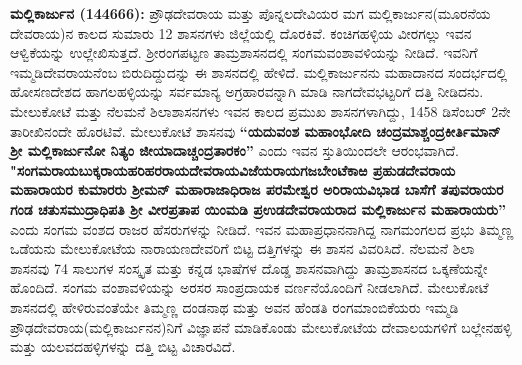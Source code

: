 \textbf{ಮಲ್ಲಿಕಾರ್ಜುನ (1446\general{\enginline{-}}66): }ಪ್ರೌಢದೇವರಾಯ ಮತ್ತು ಪೊನ್ನಲದೇವಿಯರ ಮಗ ಮಲ್ಲಿಕಾರ್ಜುನ\break (ಮೂರನೆಯ ದೇವರಾಯ)ನ ಕಾಲದ ಸುಮಾರು 12 ಶಾಸನಗಳು ಜಿಲ್ಲೆಯಲ್ಲಿ ದೊರಕಿವೆ. ಕಂಚಿಗಹಳ್ಳಿಯ ವೀರಗಲ್ಲು ಇವನ ಆಳ್ವಿಕೆಯನ್ನು ಉಲ್ಲೇಖಿಸುತ್ತದೆ. ಶ‍್ರೀರಂಗಪಟ್ಟಣ ತಾಮ್ರಶಾಸನದಲ್ಲಿ ಸಂಗಮವಂಶಾವಳಿಯನ್ನು ನೀಡಿದೆ. ಇವನಿಗೆ ಇಮ್ಮಡಿದೇವರಾಯ\-ನೆಂಬ ಬಿರುದಿದ್ದುದನ್ನು ಈ ಶಾಸನದಲ್ಲಿ ಹೇಳಿದೆ. ಮಲ್ಲಿಕಾರ್ಜುನನು ಮಹಾದಾನದ ಸಂದರ್ಭದಲ್ಲಿ ಹೋಸಣದೇಶದ ಹಾಗಲಹಳ್ಳಿಯನ್ನು ಸರ್ವಮಾನ್ಯ ಅಗ್ರಹಾರವನ್ನಾಗಿ ಮಾಡಿ ನಾಗದೇವಭಟ್ಟರಿಗೆ ದತ್ತಿ ನೀಡಿದನು. ಮೇಲುಕೋಟೆ ಮತ್ತು ನೆಲಮನೆ ಶಿಲಾಶಾಸನಗಳು ಇವನ ಕಾಲದ ಪ್ರಮುಖ ಶಾಸನಗಳಾಗಿದ್ದು, 1458 ಡಿಸೆಂಬರ್​ 2ನೇ ತಾರೀಖಿನಂದೇ ಹೊರಟಿವೆ. ಮೇಲುಕೋಟೆ ಶಾಸನವು \textbf{“ಯದುವಂಶ ಮಹಾಂಭೋದಿ ಚಂದ್ರಮಾಶ್ಚಂದ್ರಕೀರ್ತಿಮಾನ್​ ಶ‍್ರೀ ಮಲ್ಲಿಕಾರ್ಜುನೋ ನಿತ್ಯಂ ಜೀಯಾದಾಚ್ಚಂದ್ರತಾರಕಂ”} ಎಂದು ಇವನ ಸ್ತುತಿಯಿಂದಲೇ ಆರಂಭವಾಗಿದೆ. \textbf{"ಸಂಗಮರಾಯ\general{\enginline{-}}ಬುಕ್ಕರಾಯ\general{\enginline{-}}ಹರಿಹರರಾಯ\general{\enginline{-}}ದೇವರಾಯ\general{\enginline{-}}ವಿಜೆಯರಾಯ\general{\enginline{-}}ಗಜಬೇಂಟೆಕಾಱ ಪ್ರಹುಡದೇವರಾಯ ಮಹಾರಾಯರ ಕುಮಾರರು ಶ‍್ರೀಮನ್​ ಮಹಾರಾಜಾಧಿರಾಜ ಪರಮೇಶ್ವರ ಅರಿರಾಯವಿಭಾಡ ಬಾಸೆಗೆ ತಪುವರಾಯರ ಗಂಡ ಚತುಸಮುದ್ರಾಧಿಪತಿ ಶ‍್ರೀ ವೀರಪ್ರತಾಪ ಯಿಂಮಡಿ ಪ್ರಉಡದೇವರಾಯ\-ರಾದ ಮಲ್ಲಿಕಾರ್ಜುನ ಮಹಾರಾಯರು”} ಎಂದು ಸಂಗಮ ವಂಶದ ರಾಜರ ಹೆಸರುಗಳನ್ನು ನೀಡಿದೆ. ಇವನ ಮಹಾಪ್ರಧಾನ\-ನಾಗಿದ್ದ ನಾಗಮಂಗಲದ ಪ್ರಭು ತಿಮ್ಮಣ್ಣ ಒಡೆಯನು ಮೇಲುಕೋಟೆಯ ನಾರಾಯಣದೇವರಿಗೆ ಬಿಟ್ಟ ದತ್ತಿಗಳನ್ನು ಈ ಶಾಸನ ವಿವರಿಸಿದೆ. ನೆಲಮನೆ ಶಿಲಾ ಶಾಸನವು 74 ಸಾಲುಗಳ ಸಂಸ್ಕೃತ ಮತ್ತು ಕನ್ನಡ ಭಾಷೆಗಳ ದೊಡ್ಡ ಶಾಸನವಾಗಿದ್ದು ತಾಮ್ರಶಾಸನದ ಒಕ್ಕಣೆಯನ್ನೇ ಹೊಂದಿದೆ. ಸಂಗಮ ವಂಶಾವಳಿಯನ್ನು ಅರಸರ ಸಾಂಪ್ರದಾಯಕ ವರ್ಣನೆಯೊಂದಿಗೆ ನೀಡಲಾಗಿದೆ. ಮೇಲುಕೋಟೆ ಶಾಸನದಲ್ಲಿ ಹೇಳಿರುವಂತೆಯೇ ತಿಮ್ಮಣ್ಣ ದಂಡನಾಥ ಮತ್ತು ಅವನ ಹೆಂಡತಿ ರಂಗಮಾಂಬಿಕೆಯರು ಇಮ್ಮಡಿ ಪ್ರೌಢದೇವರಾಯ(ಮಲ್ಲಿಕಾರ್ಜುನನ)ನಿಗೆ ವಿಜ್ಞಾಪನೆ ಮಾಡಿಕೊಂಡು ಮೇಲುಕೋಟೆಯ ದೇವಾಲಯಗಳಿಗೆ ಬಲ್ಲೇನಹಳ್ಳಿ ಮತ್ತು ಯಲವದಹಳ್ಳಿಗಳನ್ನು ದತ್ತಿ ಬಿಟ್ಟ ವಿಚಾರವಿದೆ.

